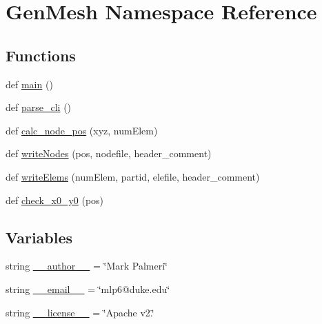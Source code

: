 \hypertarget{namespaceGenMesh}{}\section{Gen\+Mesh Namespace Reference}
\label{namespaceGenMesh}
\subsection*{Functions}
\begin{DoxyCompactItemize}
\item 
def \hyperlink{namespaceGenMesh_af11a4af1dd3bdcb8b0d3486683758812}{main} ()
\item 
def \hyperlink{namespaceGenMesh_a9a4c1f381fb4677f8dd50787b44db625}{parse\+\_\+cli} ()
\item 
def \hyperlink{namespaceGenMesh_abc935a1e9a6644479bb396c552badb4a}{calc\+\_\+node\+\_\+pos} (xyz, num\+Elem)
\item 
def \hyperlink{namespaceGenMesh_aa43424591af5f0d1524b446ac2b394d1}{write\+Nodes} (pos, nodefile, header\+\_\+comment)
\item 
def \hyperlink{namespaceGenMesh_a3aca926178f852fdb02618a5a299681d}{write\+Elems} (num\+Elem, partid, elefile, header\+\_\+comment)
\item 
def \hyperlink{namespaceGenMesh_a3f0064bed0a30d98493d7924919e6468}{check\+\_\+x0\+\_\+y0} (pos)
\end{DoxyCompactItemize}
\subsection*{Variables}
\begin{DoxyCompactItemize}
\item 
string \hyperlink{namespaceGenMesh_ae72bab920317d34184cbb5299b5f8105}{\+\_\+\+\_\+author\+\_\+\+\_\+} = \char`\"{}Mark Palmeri\char`\"{}
\item 
string \hyperlink{namespaceGenMesh_a0d6434d536da6f76b95e6c47f8399d32}{\+\_\+\+\_\+email\+\_\+\+\_\+} = \char`\"{}mlp6@duke.\+edu\char`\"{}
\item 
string \hyperlink{namespaceGenMesh_a2098deb4051637a89446d6660704ff62}{\+\_\+\+\_\+license\+\_\+\+\_\+} = \char`\"{}Apache v2.\char`\"{}
\end{DoxyCompactItemize}


